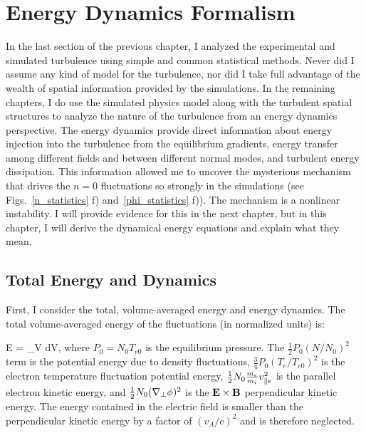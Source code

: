 \chapter{Energy Dynamics Formalism}
\label{c_en_formalism}

In the last section of the previous chapter, I analyzed the experimental and simulated turbulence using simple and common statistical methods. Never did I assume any kind of model for the turbulence,
nor did I take full advantage of the wealth of spatial information provided by the simulations. In the remaining chapters, I do use the simulated physics model along with the turbulent spatial
structures to analyze the nature of the turbulence from an energy dynamics perspective. The energy dynamics provide direct information about energy injection into the turbulence from the equilibrium
gradients, energy transfer among different fields and between different normal modes, and turbulent energy dissipation. This information allowed me to uncover the mysterious mechanism that
drives the $n=0$ fluctuations so strongly in the simulations (see Figs.~\ref{n_statistics} f) and~\ref{phi_statistics} f)). The mechanism is a nonlinear instability. I will provide evidence
for this in the next chapter, but in this chapter, I will derive the dynamical energy equations and explain what they mean.

\section{Total Energy and Dynamics}
\label{s_tot_en_dyn}

First, I consider the total, volume-averaged energy and energy dynamics. The total volume-averaged energy of the fluctuations (in normalized units) is:

\beq
\label{tot_energy}
E =  \int_V   dV,
\eeq
where $P_0 = N_0 T_{e0}$ is the equilibrium pressure.
The $\frac{1}{2} P_0 (N/N_0)^2$ term is the potential energy due to density fluctuations, $\frac{3}{4} P_0 (T_e/T_{e0})^2$ is the electron temperature fluctuation potential energy,
$\frac{1}{2} N_0 \frac{m_e}{m_i} v_{\parallel e}^2$ is the parallel electron kinetic energy, and $\frac{1}{2} N_0 (\nabla_\perp \phi)^2$ is the ${\bf E \times B}$ perpendicular kinetic energy.
The energy contained in the electric field is smaller than the perpendicular kinetic energy by a factor of $(v_A/c)^2$ and is therefore neglected.

